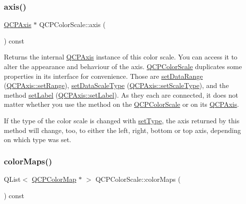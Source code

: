 \subsubsection{\texorpdfstring{axis()}{axis()}}
{\footnotesize\ttfamily \hyperlink{classQCPAxis}{Q\+C\+P\+Axis} $\ast$ Q\+C\+P\+Color\+Scale\+::axis (\begin{DoxyParamCaption}{ }\end{DoxyParamCaption}) const\hspace{0.3cm}{\ttfamily [inline]}}

Returns the internal \hyperlink{classQCPAxis}{Q\+C\+P\+Axis} instance of this color scale. You can access it to alter the appearance and behaviour of the axis. \hyperlink{classQCPColorScale}{Q\+C\+P\+Color\+Scale} duplicates some properties in its interface for convenience. Those are \hyperlink{classQCPColorScale_abe88633003a26d1e756aa74984587fef}{set\+Data\+Range} (\hyperlink{classQCPAxis_aebdfea5d44c3a0ad2b4700cd4d25b641}{Q\+C\+P\+Axis\+::set\+Range}), \hyperlink{classQCPColorScale_aeb6107d67dd7325145b2498abae67fc3}{set\+Data\+Scale\+Type} (\hyperlink{classQCPAxis_adef29cae617af4f519f6c40d1a866ca6}{Q\+C\+P\+Axis\+::set\+Scale\+Type}), and the method \hyperlink{classQCPColorScale_aee124ae8396320cacf8276e9a0fbb8ce}{set\+Label} (\hyperlink{classQCPAxis_a33bcc382c111c9f31bb0687352a2dea4}{Q\+C\+P\+Axis\+::set\+Label}). As they each are connected, it does not matter whether you use the method on the \hyperlink{classQCPColorScale}{Q\+C\+P\+Color\+Scale} or on its \hyperlink{classQCPAxis}{Q\+C\+P\+Axis}.

If the type of the color scale is changed with \hyperlink{classQCPColorScale_a1bf9bdb291927c422dd66b404b206f1f}{set\+Type}, the axis returned by this method will change, too, to either the left, right, bottom or top axis, depending on which type was set. \mbox{\label{classQCPColorScale_a556adc6b0216ebc1cc4317c541956d06}} 
\subsubsection{\texorpdfstring{color\+Maps()}{colorMaps()}}
{\footnotesize\ttfamily Q\+List$<$ \hyperlink{classQCPColorMap}{Q\+C\+P\+Color\+Map} $\ast$ $>$ Q\+C\+P\+Color\+Scale\+::color\+Maps (\begin{DoxyParamCaption}{ }\end{DoxyParamCaption}) const}

